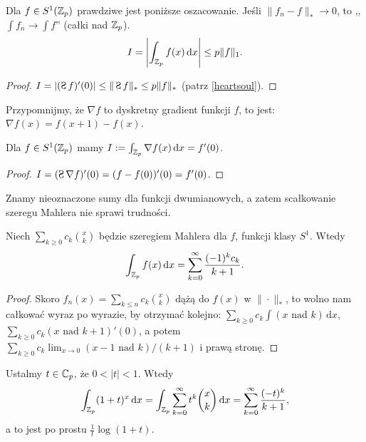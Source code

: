 
\begin{fakt}
	Dla $f \in S^1(\mathbb Z_p)$ prawdziwe jest poniższe oszacowanie.
	Jeśli $\|f_n - f\|_* \to 0$, to ,,$\int f_n \to \int f$'' (całki nad $\mathbb Z_p$).
	\[
		I = \left | \int_{\mathbb Z_p} f(x)\,\textrm{d}x \right| \le p \| f\|_1.
	\]
\end{fakt}

\begin{proof}
	$I = |(\suma f)'(0)| \le \|\suma f\|_* \le p \|f\|_*$ (patrz \ref{heartsoul}).
\end{proof}

Przypomnijmy, że $\nabla f$ to dyskretny gradient funkcji $f$, to jest: $\nabla f(x) = f(x+1) - f(x)$.

\begin{fakt} \label{festniemalsauf}
	Dla $f \in S^1(\mathbb Z_p)$ mamy $I := \int_{\mathbb Z_p} \nabla f(x) \,\textrm{d}x = f'(0)$.
\end{fakt}

\begin{proof}
	$I = (\suma \nabla f)'(0) = (f - f(0))'(0) = f'(0)$.
\end{proof}

Znamy nieoznaczone sumy dla funkcji dwumianowych, a zatem scałkowanie szeregu Mahlera nie sprawi trudności.

\begin{fakt}
	Niech $\sum_{k\ge0} c_k {x \choose k}$ będzie szeregiem Mahlera dla $f$, funkcji klasy $S^1$.
	Wtedy
	\[
		\int_{\mathbb Z_p} f(x) \,\textrm{d}x = \sum_{k = 0}^\infty \frac{(-1)^kc_k}{k+1}.
	\]
\end{fakt}

\begin{proof}
	Skoro $f_n(x) = \sum_{k\le n} c_k {x \choose k}$ dążą do $f(x)$ w $\|\cdot\|_*$, to wolno nam całkować wyraz po wyrazie, by otrzymać kolejno: $\sum_{k \ge 0} c_k \int (x \mbox{ nad } k) \,\textrm{d}x$, $\sum_{k \ge 0} c_k (x \mbox{ nad } k+1)'(0)$, a potem $\sum_{k \ge 0} c_k \lim_{x \to 0} (x-1 \mbox{ nad }k) / (k+1)$ i prawą stronę.
\end{proof}

\begin{przyklad}
	Ustalmy $t \in \mathbb C_p$, że $0 < |t| < 1$.
	Wtedy
	\[
		\int_{\Z_p} (1+t)^x \,\textrm{d}x =
		\int_{\Z_p} \sum_{k=0}^\infty t^k {x \choose k} \,\textrm{d}x = 
		\sum_{k=0}^\infty \frac{(-t)^k}{k+1},%
	\]
	a to jest po prostu $\frac 1 t \log (1+t)$.
\end{przyklad}

